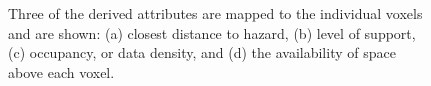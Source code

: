 \begin{figure}
{{	    }
	    \label{fig:overview:precomputation:supportfield}
	}
	\caption{Three of the derived attributes are mapped to the individual voxels and are shown: (a) closest distance to hazard, (b) level of support, (c) occupancy, or data density, and (d) the availability of space above each voxel.}
    \label{fig:overview:precomputation}
\end{figure}

